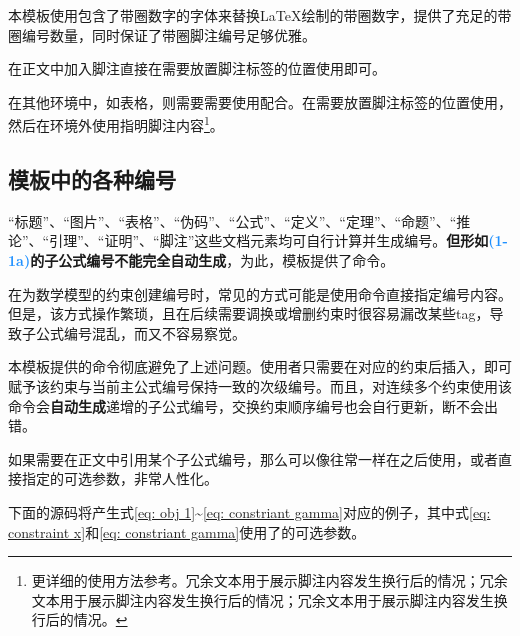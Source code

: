 \documentclass[QingNianC, vlined, timesmathnogreek]{nsfc}
\begin{document}
	本模板使用包含了带圈数字的字体来替换LaTeX绘制的带圈数字，提供了充足的带圈编号数量，同时保证了带圈脚注编号足够优雅。
	
	在正文中加入脚注直接在需要放置脚注标签的位置使用即可。
	
	在其他环境中，如表格，则需要需要使用配合。在需要放置脚注标签的位置使用，然后在环境外使用指明脚注内容\footnote{更详细的使用方法参考\href{https://blog.csdn.net/xovee/article/details/127563209}{\ttfamily\color{DarkRed}}。冗余文本用于展示脚注内容发生换行后的情况；冗余文本用于展示脚注内容发生换行后的情况；冗余文本用于展示脚注内容发生换行后的情况。}。
	
	
	\subsection{模板中的各种编号}
	
	“标题”、“图片”、“表格”、“伪码”、“公式”、“定义”、“定理”、“命题”、“推论”、“引理”、“证明”、“脚注”这些文档元素均可自行计算并生成编号。\textbf{但形如\textcolor{DodgerBlue}{(1-1a)}的子公式编号不能完全自动生成}，为此，模板提供了命令。

	在为数学模型的约束创建编号时，常见的方式可能是使用命令直接指定编号内容。但是，该方式操作繁琐，且在后续需要调换或增删约束时很容易漏改某些tag，导致子公式编号混乱，而又不容易察觉。

	本模板提供的命令彻底避免了上述问题。使用者只需要在对应的约束后插入，即可赋予该约束与当前主公式编号保持一致的次级编号。而且，对连续多个约束使用该命令会\textbf{自动生成}递增的子公式编号，交换约束顺序编号也会自行更新，断不会出错。
	
	如果需要在正文中引用某个子公式编号，那么可以像往常一样在之后使用，或者直接指定的可选参数，非常人性化。
	
	下面的源码将产生式\eqref{eq: obj 1}\textasciitilde \eqref{eq: constriant gamma}对应的例子，其中式\eqref{eq: constraint x}和\eqref{eq: constriant gamma}使用了的可选参数。
	
\end{document}
